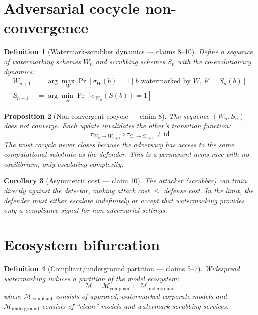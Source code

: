 \documentclass[11pt,a4paper]{article}
\newtheorem{definition}{Definition}[section]
\newtheorem{proposition}[definition]{Proposition}
\newtheorem{corollary}[definition]{Corollary}
\begin{document}
\section{Adversarial cocycle non-convergence}
\label{sec:arms-race}

\begin{definition}[Watermark-scrubber dynamics --- claims 8--10]
\label{def:arms-race}
Define a sequence of watermarking schemes $W_n$ and scrubbing schemes $S_n$
with the co-evolutionary dynamics:
\begin{align}
  W_{n+1} &= \arg\max_W \Pr[\sigma_W(b) = 1 \mid b \text{ watermarked by } W,\; b' = S_n(b)] \\
  S_{n+1} &= \arg\min_S \Pr[\sigma_{W_n}(S(b)) = 1]
\end{align}
\end{definition}

\begin{proposition}[Non-convergent cocycle --- claim 8]
\label{prop:non-convergent}
The sequence $(W_n, S_n)$ does not converge. Each update invalidates the
other's transition function:
\[
  \tau_{W_n \to W_{n+1}} \circ \tau_{S_n \to S_{n+1}} \neq \mathrm{id}
\]
The trust cocycle never closes because the adversary has access to the
same computational substrate as the defender. This is a permanent arms
race with no equilibrium, only escalating complexity.
\end{proposition}

\begin{corollary}[Asymmetric cost --- claim 10]
The attacker (scrubber) can train directly against the detector, making
attack cost $\leq$ defense cost. In the limit, the defender must either
escalate indefinitely or accept that watermarking provides only a
compliance signal for non-adversarial settings.
\end{corollary}

\section{Ecosystem bifurcation}
\label{sec:bifurcation}

\begin{definition}[Compliant/underground partition --- claims 5--7]
\label{def:partition}
Widespread watermarking induces a partition of the model ecosystem:
\[
  \mathcal{M} = \mathcal{M}_{\text{compliant}} \sqcup \mathcal{M}_{\text{underground}}
\]
where $\mathcal{M}_{\text{compliant}}$ consists of approved, watermarked
corporate models and $\mathcal{M}_{\text{underground}}$ consists of
``clean'' models and watermark-scrubbing services.
\end{definition}
\end{document}
